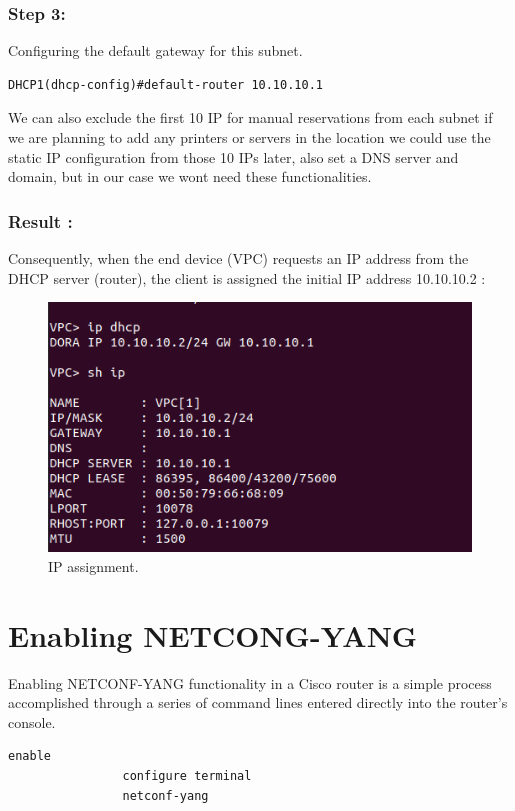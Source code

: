 \subsubsection{Step 3:}
Configuring the default gateway for this subnet.
\begin{lstlisting}[style=cliStyle,  backgroundcolor=\color{codebackground}]
                DHCP1(dhcp-config)#default-router 10.10.10.1
\end{lstlisting}

We can also exclude the first 10 IP for manual reservations from each subnet if we are planning to add any printers or servers in the location we could use the static IP configuration from those 10 IPs later, also set a DNS server and domain, but in our case we wont need these functionalities.

\subsubsection{Result :}
Consequently, when the end device (VPC) requests an IP address from the DHCP server (router), the client is assigned the initial IP address 10.10.10.2 :
\begin{figure}[h]
    \centering
    \includegraphics[width=0.7\linewidth]{Images/VPC_dhcp.png}
    \caption{IP assignment.}
\end{figure}

\section{Enabling NETCONG-YANG}

Enabling NETCONF-YANG functionality in a Cisco router is a simple process accomplished through a series of command lines entered directly into the router's console.

\begin{lstlisting}[style=cliStyle,  backgroundcolor=\color{codebackground}]
                enable 
                configure terminal
                netconf-yang
\end{lstlisting}

